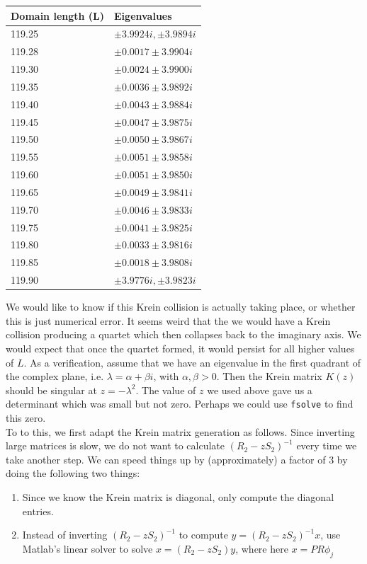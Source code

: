 \documentclass[12pt]{article}
\begin{document}
\begin{table}[H]
\begin{tabular}{l|l}
Domain length (L) & Eigenvalues \\ \hline
119.25 & $\pm 3.9924i, \pm 3.9894i$ \\
119.28 & $\pm 0.0017 \pm 3.9904i$\\ 
119.30 & $\pm 0.0024 \pm 3.9900i$\\
119.35 & $\pm 0.0036 \pm 3.9892i$\\
119.40 & $\pm 0.0043 \pm 3.9884i$\\
119.45 & $\pm 0.0047 \pm 3.9875i$\\
119.50 & $\pm 0.0050 \pm 3.9867i$\\
119.55 & $\pm 0.0051 \pm 3.9858i$\\
119.60 & $\pm 0.0051 \pm 3.9850i$\\
119.65 & $\pm 0.0049 \pm 3.9841i$\\
119.70 & $\pm 0.0046 \pm 3.9833i$\\
119.75 & $\pm 0.0041 \pm 3.9825i$\\
119.80 & $\pm 0.0033 \pm 3.9816i$\\
119.85 & $\pm 0.0018 \pm 3.9808i$\\
119.90 & $\pm 3.9776i, \pm 3.9823i$\\
\end{tabular}
\end{table}

We would like to know if this Krein collision is actually taking place, or whether this is just numerical error. It seems weird that the we would have a Krein collision producing a quartet which then collapses back to the imaginary axis. We would expect that once the quartet formed, it would persist for all higher values of $L$. As a verification, assume that we have an eigenvalue in the first quadrant of the complex plane, i.e. $\lambda = \alpha + \beta i$, with $\alpha, \beta > 0.$ Then the Krein matrix $K(z)$ should be singular at $z = -\lambda^2$. The value of $z$ we used above gave us a determinant which was small but not zero. Perhaps we could use \texttt{fsolve} to find this zero.\\

To to this, we first adapt the Krein matrix generation as follows. Since inverting large matrices is slow, we do not want to calculate $(R_2 - zS_2)^{-1}$ every time we take another step. We can speed things up by (approximately) a factor of 3 by doing the following two things:
\begin{enumerate}
	\item Since we know the Krein matrix is diagonal, only compute the diagonal entries.
	\item Instead of inverting $(R_2 - zS_2)^{-1}$ to compute $y = (R_2 - zS_2)^{-1} x$, use Matlab's linear solver to solve $x = (R_2 - zS_2) y$, where here $x = P R \phi_j$ 
\end{enumerate}
\end{document}
